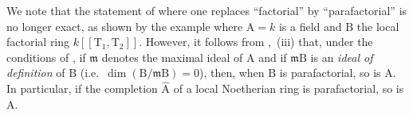 \begin{env}[21.13.12.1]
\label{IV.21.13.12.1}
We note that the statement of  where one replaces ``factorial'' by ``parafactorial'' is no longer exact, as shown by the example where $\mathrm{A}=k$ is a field and $\mathrm{B}$ the local factorial ring $k[[\mathrm{T}_1,\mathrm{T}_2]]$.
However, it follows from ,~(iii) that, under the conditions of , if $\mathfrak{m}$ denotes the maximal ideal of $\mathrm{A}$ and if $\mathfrak{m}\mathrm{B}$ is an \emph{ideal of definition} of $\mathrm{B}$ (i.e.\ $\dim(\mathrm{B}/\mathfrak{m}\mathrm{B})=0$), then, when $\mathrm{B}$ is parafactorial, so is $\mathrm{A}$.
In particular, if the completion $\widehat{\mathrm{A}}$ of a local Noetherian ring is parafactorial, so is $\mathrm{A}$.
\end{env}

